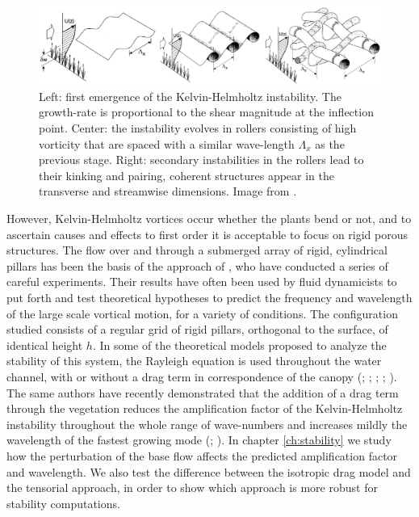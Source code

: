 \begin{figure}[h]
	\centering
	\includegraphics[width=1\linewidth]{chapter_1/finn}
	\caption{Left: first emergence of the Kelvin-Helmholtz instability. The growth-rate is proportional to the shear magnitude at the inflection point. Center: the instability evolves in rollers consisting of high vorticity that are spaced with a similar wave-length $\Lambda_x$ as the previous stage.  Right: secondary instabilities in the rollers lead to their kinking and pairing, coherent structures appear in the transverse and streamwise dimensions. Image from \citet{finnigan2000turbulence}.}
	\label{fig:monai_evol}
\end{figure}


However, Kelvin-Helmholtz vortices occur whether the plants bend or not, and to ascertain causes and effects to first order it is acceptable to focus on rigid porous structures.
The flow over and through a submerged array of rigid, cylindrical pillars has been the basis of the approach of \citet{ghisalberti2002mixing} \cite{ghisalberti2004limited} \cite{ghisalberti2005mass}, who have conducted a series of careful experiments. Their results have often been used by fluid dynamicists to put forth and test theoretical hypotheses to predict the frequency and wavelength of the large scale vortical motion, for a variety of conditions.
The configuration studied consists of a regular grid of rigid pillars, orthogonal to the surface, of identical height $h$.
In some of the theoretical models proposed to analyze the stability of this system, the Rayleigh equation is
used throughout the water channel, with or without a drag term in correspondence of the canopy (\citet{raupach1996coherent}; \citet{py2004mixing}; \citet{singh2016linear}; \citet{zampogna2016instability}; \citet{luminari2016drag}). The same authors have recently demonstrated that the addition of a drag term through the vegetation reduces the amplification factor of the Kelvin-Helmholtz instability throughout the whole range of wave-numbers and increases mildly the wavelength of the fastest growing mode (\citet{zampogna2016instability}; \citet{luminari2016drag}).
In chapter \ref{ch:stability} we study how the perturbation of the base flow affects the predicted amplification factor and wavelength. We also test the difference between the isotropic drag model and the tensorial approach, in order to show which approach is more robust for stability computations.


